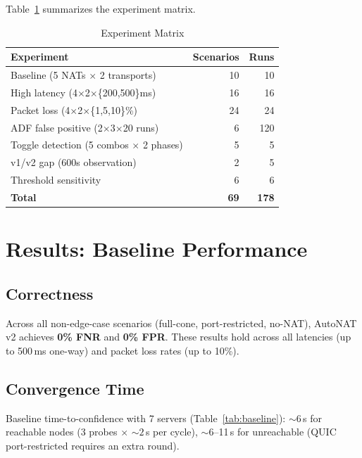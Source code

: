 \documentclass[conference]{IEEEtran}
\begin{document}
Table~\ref{tab:experiments} summarizes the experiment matrix.

\begin{table}[htbp]
\caption{Experiment Matrix}
\label{tab:experiments}
\centering
\begin{tabular}{@{}lrr@{}}
\toprule
Experiment & Scenarios & Runs \\
\midrule
Baseline (5 NATs $\times$ 2 transports) & 10 & 10 \\
High latency (4$\times$2$\times$\{200,500\}ms) & 16 & 16 \\
Packet loss (4$\times$2$\times$\{1,5,10\}\%) & 24 & 24 \\
ADF false positive (2$\times$3$\times$20 runs) & 6 & 120 \\
Toggle detection (5 combos $\times$ 2 phases) & 5 & 5 \\
v1/v2 gap (600s observation) & 2 & 5 \\
Threshold sensitivity & 6 & 6 \\
\midrule
\textbf{Total} & \textbf{69} & \textbf{178} \\
\bottomrule
\end{tabular}
\end{table}

\section{Results: Baseline Performance}

\subsection{Correctness}

Across all non-edge-case scenarios (full-cone, port-restricted, no-NAT), AutoNAT v2 achieves \textbf{0\% FNR} and \textbf{0\% FPR}. These results hold across all latencies (up to 500\,ms one-way) and packet loss rates (up to 10\%).

\subsection{Convergence Time}

Baseline time-to-confidence with 7 servers (Table~\ref{tab:baseline}): ${\sim}6$\,s for reachable nodes (3 probes $\times$ ${\sim}2$\,s per cycle), ${\sim}6$--11\,s for unreachable (QUIC port-restricted requires an extra round).
\end{document}
